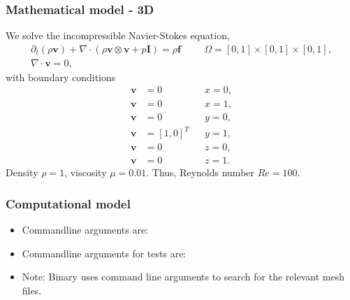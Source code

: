 \subsubsection{Mathematical model - 3D}
%
We solve the incompressible Navier-Stokes equation,
%
\begin{align}
    \partial_{t} (\rho \boldsymbol{v}) + \nabla \cdot (\rho \boldsymbol{v} \otimes \boldsymbol{v} + p \boldsymbol{I}) = \rho \boldsymbol{f} & &&\Omega = [0, 1] \times [0, 1] \times [0, 1], \\
    \nabla \cdot \boldsymbol{v} = 0,
\end{align}
%
with boundary conditions
%
\begin{align}
    \boldsymbol{v} &= 0         &&x = 0, \\
    \boldsymbol{v} &= 0         &&x = 1, \\
    \boldsymbol{v} &= 0         &&y = 0, \\
    \boldsymbol{v} &= [1, 0]^T  &&y = 1, \\
    \boldsymbol{v} &= 0         &&z = 0, \\
    \boldsymbol{v} &= 0         &&z = 1.
\end{align}
%
Density $\rho = 1$, viscosity $\mu = 0.01$. Thus, Reynolds number $Re = 100$.
%
%
\subsubsection{Computational model}
%
\begin{itemize}
    \item{Commandline arguments are:}
    \item{Commandline arguments for tests are:}
    \item{Note: Binary uses command line arguments to search for the relevant mesh files.}
\end{itemize}
%
%
